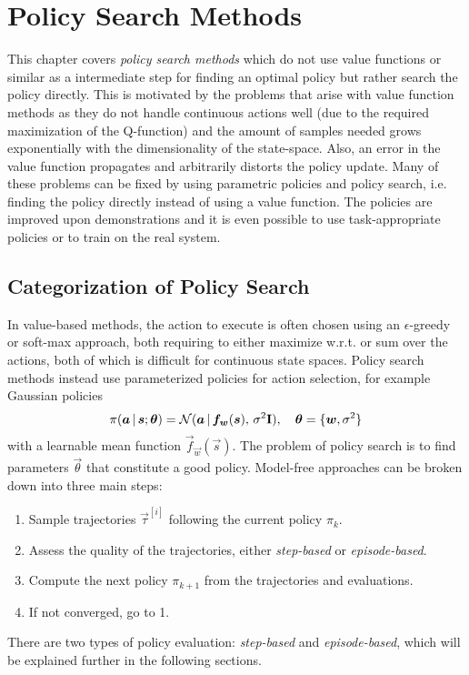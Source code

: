 \chapter{Policy Search Methods}
	\label{c:policySearch}

	This chapter covers \emph{policy search methods} which do not use value functions or similar as a intermediate step for finding an optimal policy but rather search the policy directly. This is motivated by the problems that arise with value function methods as they do not handle continuous actions well (due to the required maximization of the Q-function) and the amount of samples needed grows exponentially with the dimensionality of the state-space. Also, an error in the value function propagates and arbitrarily distorts the policy update. Many of these problems can be fixed by using parametric policies and policy search, i.e. finding the policy directly instead of using a value function. The policies are improved upon demonstrations and it is even possible to use task-appropriate policies or to train on the real system.

	\section{Categorization of Policy Search}
		In value-based methods, the action to execute is often chosen using an \(\epsilon\)-greedy or soft-max approach, both requiring to either maximize w.r.t. or sum over the actions, both of which is difficult for continuous state spaces. Policy search methods instead use parameterized policies for action selection, for example Gaussian policies
		\begin{equation*}
			\pi(\bm{a} \,\vert\, \bm{s}; \bm{\theta}) = \mathcal{N}(\bm{a} \,\vert\, \bm{f}_{\bm{w}}(\bm{s}),\, \sigma^2 \bm{\mathrm{I}}),\quad \bm{\theta} = \{ \bm{w}, \sigma^2 \}
		\end{equation*}
		with a learnable mean function \( \vec{f}_{\vec{w}}(\vec{s}) \). The problem of policy search is to find parameters \( \vec{\theta} \) that constitute a good policy. Model-free approaches can be broken down into three main steps:
		\begin{enumerate}
			\item {} Sample trajectories \( \vec{\tau}^{[i]} \) following the current policy \( \pi_k \).
			\item {} Assess the quality of the trajectories, either \emph{step-based} or \emph{episode-based}.
			\item {} Compute the next policy \( \pi_{k + 1} \) from the trajectories and evaluations.
			\item If not converged, go to 1.
		\end{enumerate}
		There are two types of policy evaluation: \emph{step-based} and \emph{episode-based}, which will be explained further in the following sections.

